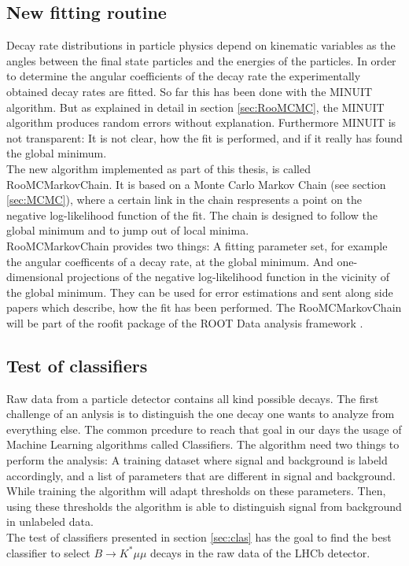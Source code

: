 \documentclass[english]{uzhpub}
\begin{document}
\subsection{New fitting routine}
Decay rate distributions in particle physics depend on kinematic variables as the angles between the final state particles and the energies of the particles. In order to determine the angular coefficients of the decay rate the experimentally obtained decay rates are fitted.
So far this has been done with the MINUIT \cite{bib:Minuit} algorithm. But as explained in detail in section \ref{sec:RooMCMC}, the MINUIT algorithm produces random errors without explanation. Furthermore MINUIT is not transparent: It is not clear, how the fit is performed, and if it really has found the global minimum. \\
The new algorithm implemented as part of this thesis, is called RooMCMarkovChain. It is based on a Monte Carlo Markov Chain (see section \ref{sec:MCMC}), where a certain link in the chain respresents a point on the negative log-likelihood function of the fit. The chain is designed to follow the global minimum and to jump out of local minima. \\
RooMCMarkovChain provides two things: A fitting parameter set, for example the angular coefficents of a decay rate, at the global minimum. And one-dimensional projections of the  negative log-likelihood function in the vicinity of the global minimum. They can be used for error estimations and sent along side papers which describe, how the fit has been performed.
The RooMCMarkovChain will be part of the roofit package of the ROOT Data analysis framework \cite{bib:root}.

\subsection{Test of classifiers}
Raw data from a particle detector contains all kind possible decays. The first challenge of an anlysis is to distinguish the one decay one wants to analyze from everything else.
The common prcedure to reach that goal in our days the usage of Machine Learning algorithms called Classifiers. The algorithm need two things to perform the analysis: A training dataset where signal and background is labeld accordingly, and a list of parameters that are different in signal and background. While training the algorithm will adapt thresholds on these parameters. Then, using these thresholds the algorithm is able to distinguish signal from background in unlabeled data. \\
The test of classifiers presented in section \ref{sec:clas} has the goal to find the best classifier to select $B \rightarrow K^* \mu \mu$ decays in the raw data of the LHCb detector.
\end{document}
